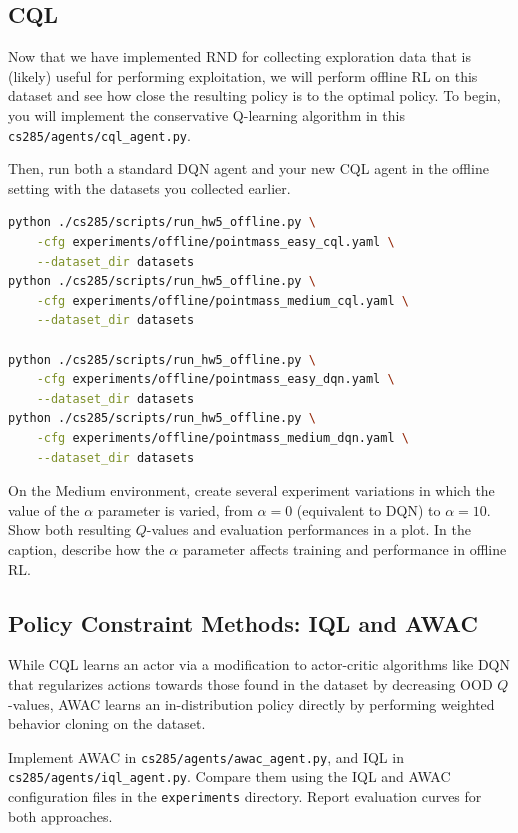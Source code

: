 \documentclass{article}
\begin{document}
\subsection{CQL}
Now that we have implemented RND for collecting exploration data that is (likely) useful for performing exploitation, we will perform offline RL on this dataset and see how close the resulting policy is to the optimal policy. To begin, you will implement the conservative Q-learning algorithm in this \verb+cs285/agents/cql_agent.py+.

Then, run both a standard DQN agent and your new CQL agent in the offline setting with the datasets you collected earlier.

\begin{lstlisting}[language=bash]
python ./cs285/scripts/run_hw5_offline.py \
    -cfg experiments/offline/pointmass_easy_cql.yaml \
    --dataset_dir datasets
python ./cs285/scripts/run_hw5_offline.py \
    -cfg experiments/offline/pointmass_medium_cql.yaml \
    --dataset_dir datasets

python ./cs285/scripts/run_hw5_offline.py \
    -cfg experiments/offline/pointmass_easy_dqn.yaml \
    --dataset_dir datasets
python ./cs285/scripts/run_hw5_offline.py \
    -cfg experiments/offline/pointmass_medium_dqn.yaml \
    --dataset_dir datasets
\end{lstlisting}

On the Medium environment, create several experiment variations in which the value of the $\alpha$ parameter is varied, from $\alpha=0$ (equivalent to DQN) to $\alpha=10$. Show both resulting $Q$-values and evaluation performances in a plot. In the caption, describe how the $\alpha$ parameter affects training and performance in offline RL.

\begin{sol}
    
\end{sol}

\subsection{Policy Constraint Methods: IQL and AWAC}
While CQL learns an actor via a modification to actor-critic algorithms like DQN that regularizes actions towards those found in the dataset by decreasing OOD $Q$-values, AWAC learns an in-distribution policy directly by performing weighted behavior cloning on the dataset.

Implement AWAC in \verb+cs285/agents/awac_agent.py+, and IQL in \verb+cs285/agents/iql_agent.py+. Compare them using the IQL and AWAC configuration files in the \verb+experiments+ directory. Report evaluation curves for both approaches.
\end{document}
